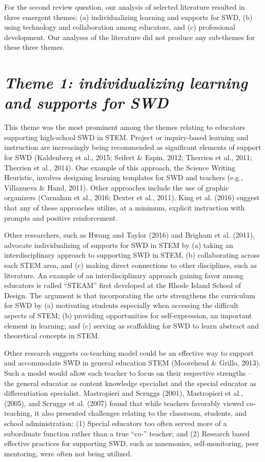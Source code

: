 \documentclass[11pt]{sig-alternate}
\begin{document}
\begin{large}
For the second review question, our analysis of selected literature resulted in three emergent themes: (a) individualizing learning and supports for SWD, (b) using technology and collaboration among educators, and (c) professional development. Our analyses of the literature did not produce any sub-themes for these three themes. 

\section*{\textit{Theme 1: individualizing learning and supports for SWD}}
 This theme was the most prominent among the themes relating to educators supporting high-school SWD in STEM. Project or inquiry-based learning and instruction are increasingly being recommended as significant elements of support for SWD (Kaldenberg et al., 2015; Seifert \& Espin, 2012; Therrien et al., 2011; Therrien et al., 2014). One example of this approach, the Science Writing Heuristic, involves designing learning templates for SWD and teachers (e.g., Villanueva \& Hand, 2011). Other approaches include the use of graphic organizers (Carnahan et al., 2016; Dexter et al., 2011). King et al. (2016) suggest that any of these approaches utilize, at a minimum, explicit instruction with prompts and positive reinforcement. 

Other researchers, such as Hwang and Taylor (2016) and Brigham et al. (2011), advocate individualizing of supports for SWD in STEM by (a) taking an interdisciplinary approach to supporting SWD in STEM, (b) collaborating across each STEM area, and (c) making direct connections to other disciplines, such as literature. An example of an interdisciplinary approach gaining favor among educators is called “STEAM” first developed at the Rhode Island School of Design. The argument is that incorporating the arts strengthens the curriculum for SWD by (a) motivating students especially when accessing the difficult aspects of STEM; (b) providing opportunities for self-expression, an important element in learning; and (c) serving as scaffolding for SWD to learn abstract and theoretical concepts in STEM. 

Other research suggests co-teaching model could be an effective way to support and accommodate SWD in general education STEM (Moorehead \& Grillo, 2013). Such a model would allow each teacher to focus on their respective strengths – the general educator as content knowledge specialist and the special educator as differentiation specialist. Mastropieri and Scruggs (2001), Mastropieri et al., (2005), and Scruggs et al. (2007) found that while teachers favorably viewed co-teaching, it also presented challenges relating to the classroom, students, and school administration: (1) Special educators too often served more of a subordinate function rather than a true “co-” teacher; and (2) Research based effective practices for supporting SWD, such as mnemonics, self-monitoring, peer mentoring, were often not being utilized.       


\end{large}
\end{document}
